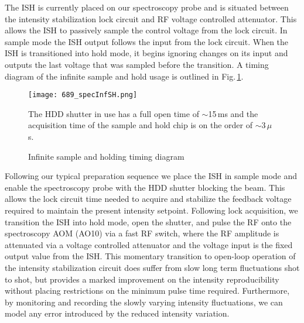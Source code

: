 The ISH is currently placed on our spectroscopy probe and is situated between the intensity stabilization lock circuit and RF voltage controlled attenuator.
This allows the ISH to passively sample the control voltage from the lock circuit.
In sample mode the ISH output follows the input from the lock circuit.
When the ISH is transitioned into hold mode, it begins ignoring changes on its input and outputs the last voltage that was sampled before the transition.
A timing diagram of the infinite sample and hold usage is outlined in Fig.\,\ref{fig:689specInfSH}.
	\begin{figure}
	\centerline{
		\texttt{[image: 689\_specInfSH.png]}}
		\caption{Infinite sample and holding timing diagram}{The HDD shutter in use has a full open time of $\sim$15\,ms and the acquisition time of the sample and hold chip is on the order of $\sim$3\,$\mu$s.}
		 \label{fig:689specInfSH}
	\end{figure}
Following our typical preparation sequence we place the ISH in sample mode and enable the spectroscopy probe with the HDD shutter blocking the beam. 
This allows the lock circuit time needed to acquire and stabilize the feedback voltage required to maintain the present intensity setpoint.
Following lock acquisition, we transition the ISH into hold mode, open the shutter, and pulse the RF onto the spectroscopy AOM (AO10) via a fast RF switch, where the RF amplitude is attenuated via a voltage controlled attenuator and the voltage input is the fixed output value from the ISH.
This momentary transition to open-loop operation of the intensity stabilization circuit does suffer from slow long term fluctuations shot to shot, but provides a marked improvement on the intensity reproducibility without placing restrictions on the minimum pulse time required.
Furthermore, by monitoring and recording the slowly varying intensity fluctuations, we can model any error introduced by the reduced intensity variation.

